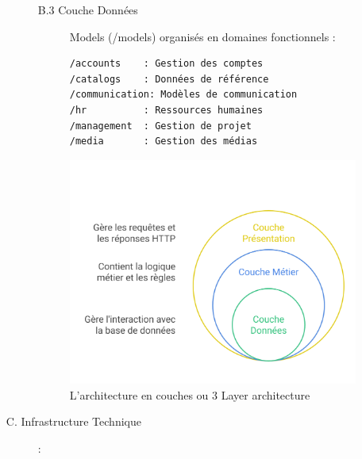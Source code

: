 \begin{enumerate}
\begin{description}
\begin{description}
\begin{description}
                    \end{description}
                \end{description}  
            
            \begin{description}
                \item[B.3 Couche Données] 

                Models (/models) organisés en domaines fonctionnels :

                \begin{verbatim}
/accounts    : Gestion des comptes
/catalogs    : Données de référence
/communication: Modèles de communication
/hr          : Ressources humaines
/management  : Gestion de projet
/media       : Gestion des médias
                \end{verbatim}
            \end{description}
            
            \begin{figure}[H]
            \begin{center}
            \includegraphics[width=15cm]{assets/presentation/architecture_en_couches.png}
            \end{center}
            \caption{L'architecture en couches ou 3 Layer architecture}
            \end{figure}
            \vspace{0.35cm}

        \item[C. Infrastructure Technique] :


\end{description}
\end{enumerate}
